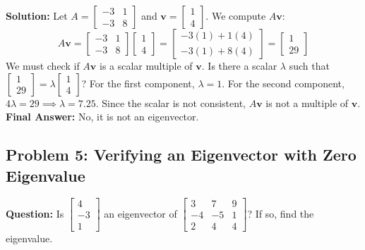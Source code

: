 \documentclass[11pt, a4paper]{article}
\theoremstyle{definition}
\theoremstyle{remark}
\begin{document}
\textbf{Solution:}
Let $A = \begin{bmatrix} -3 & 1 \\ -3 & 8 \end{bmatrix}$ and $\mathbf{v} = \begin{bmatrix} 1 \\ 4 \end{bmatrix}$. We compute $A\mathbf{v}$:
\[
A\mathbf{v} = \begin{bmatrix} -3 & 1 \\ -3 & 8 \end{bmatrix} \begin{bmatrix} 1 \\ 4 \end{bmatrix} = \begin{bmatrix} -3(1) + 1(4) \\ -3(1) + 8(4) \end{bmatrix} = \begin{bmatrix} 1 \\ 29 \end{bmatrix}
\]
We must check if $A\mathbf{v}$ is a scalar multiple of $\mathbf{v}$. Is there a scalar $\lambda$ such that $\begin{bmatrix} 1 \\ 29 \end{bmatrix} = \lambda \begin{bmatrix} 1 \\ 4 \end{bmatrix}$?
For the first component, $\lambda = 1$. For the second component, $4\lambda = 29 \implies \lambda = 7.25$. Since the scalar is not consistent, $A\mathbf{v}$ is not a multiple of $\mathbf{v}$.
\textbf{Final Answer:} No, it is not an eigenvector.

\subsection{Problem 5: Verifying an Eigenvector with Zero Eigenvalue}
\textbf{Question:} Is $\begin{bmatrix} 4 \\ -3 \\ 1 \end{bmatrix}$ an eigenvector of $\begin{bmatrix} 3 & 7 & 9 \\ -4 & -5 & 1 \\ 2 & 4 & 4 \end{bmatrix}$? If so, find the eigenvalue.
\end{document}
